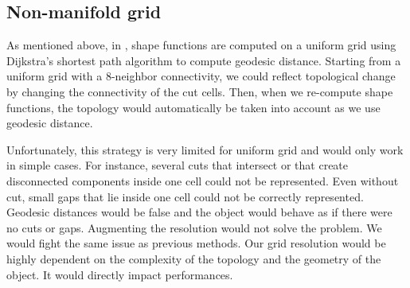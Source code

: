 
\subsection{Non-manifold grid}

As mentioned above, in \cite{Faure2011}, shape functions are computed on a uniform grid using Dijkstra's shortest path algorithm to compute geodesic distance. Starting from a uniform grid with a 8-neighbor connectivity, we could reflect topological change by changing the connectivity of the cut cells. Then, when we re-compute shape functions, the topology would automatically be taken into account as we use geodesic distance. 

Unfortunately, this strategy is very limited for uniform grid and would only work in simple cases. For instance, several cuts that intersect or that create disconnected components inside one cell could not be represented. Even without cut, small gaps that lie inside one cell could not be correctly represented. Geodesic distances would be false and the object would behave as if there were no cuts or gaps. Augmenting the resolution would not solve the problem. We would fight the same issue as previous methods. Our grid resolution would be highly dependent on the complexity of the topology and the geometry of the object. It would directly impact performances.

